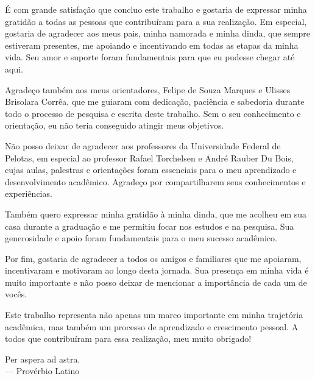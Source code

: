 \documentclass[tcc,capa]{texufpel}
\begin{document}
\begin{agradecimentos}
  É com grande satisfação que concluo este trabalho e gostaria de expressar minha gratidão a todas as pessoas que contribuíram para a sua realização. Em especial, gostaria de agradecer aos meus pais, minha namorada e minha dinda, que sempre estiveram presentes, me apoiando e incentivando em todas as etapas da minha vida. Seu amor e suporte foram fundamentais para que eu pudesse chegar até aqui.

Agradeço também aos meus orientadores, Felipe de Souza Marques e Ulisses Brisolara Corrêa, que me guiaram com dedicação, paciência e sabedoria durante todo o processo de pesquisa e escrita deste trabalho. Sem o seu conhecimento e orientação, eu não teria conseguido atingir meus objetivos.

Não posso deixar de agradecer aos professores da Universidade Federal de Pelotas, em especial ao professor Rafael Torchelsen e André Rauber Du Bois, cujas aulas, palestras e orientações foram essenciais para o meu aprendizado e desenvolvimento acadêmico. Agradeço por compartilharem seus conhecimentos e experiências.

Também quero expressar minha gratidão à minha dinda, que me acolheu em sua casa durante a graduação e me permitiu focar nos estudos e na pesquisa. Sua generosidade e apoio foram fundamentais para o meu sucesso acadêmico.

Por fim, gostaria de agradecer a todos os amigos e familiares que me apoiaram, incentivaram e motivaram ao longo desta jornada. Sua presença em minha vida é muito importante e não posso deixar de mencionar a importância de cada um de vocês.

Este trabalho representa não apenas um marco importante em minha trajetória acadêmica, mas também um processo de aprendizado e crescimento pessoal. A todos que contribuíram para essa realização, meu muito obrigado!

\end{agradecimentos}

\begin{epigrafe}
  Per aspera ad astra.\\
  {\sc --- Provérbio Latino}
\end{epigrafe}
\end{document}
